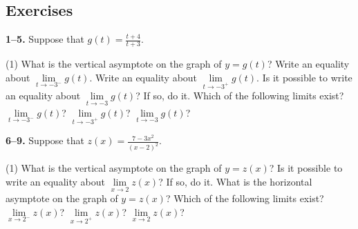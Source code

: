 \documentclass[10pt,oneside,]{book}
\theoremstyle{plain}
\theoremstyle{definition}
\numberwithin{equation}{section}
\newcommand{\fe}[2]{#1\mathopen{}\left(#2\right)\mathclose{}}
\begin{document}
\subsection[Exercises]{Exercises}\label{exercises-12}
\textbf{1--5. }\hypertarget{exercisegroup-22}{\null}Suppose that \(\fe{g}{t}=\frac{t+4}{t+3}\).%
\par
\begin{exercisegroup}(1)
\exercise[1.]\hypertarget{exercise-90}{\null}What is the vertical asymptote on the graph of \(y=\fe{g}{t}\)?%
\exercise[2.]\hypertarget{exercise-91}{\null}Write an equality about \(\lim\limits_{t\to-3^{-}}\fe{g}{t}\).%
\exercise[3.]\hypertarget{exercise-92}{\null}Write an equality about \(\lim\limits_{t\to-3^{+}}\fe{g}{t}\).%
\exercise[4.]\hypertarget{exercise-93}{\null}Is it possible to write an equality about \(\lim\limits_{t\to-3}\fe{g}{t}\)? If so, do it.%
\exercise[5.]\hypertarget{exercise-94}{\null}Which of the following limits exist?\newline{} \(\lim\limits_{t\to-3^{-}}\fe{g}{t}\)? \(\lim\limits_{t\to-3^{+}}\fe{g}{t}\)? \(\lim\limits_{t\to-3}\fe{g}{t}\)?%
\end{exercisegroup}
\par\smallskip\noindent
\textbf{6--9. }\hypertarget{exercisegroup-23}{\null}Suppose that \(\fe{z}{x}=\frac{7-3x^2}{\left(x-2\right)^2}\).%
\par
\begin{exercisegroup}(1)
\exercise[6.]\hypertarget{exercise-95}{\null}What is the vertical asymptote on the graph of \(y=\fe{z}{x}\)?%
\exercise[7.]\hypertarget{exercise-96}{\null}Is it possible to write an equality about \(\lim\limits_{x\to2}\fe{z}{x}\)? If so, do it.%
\exercise[8.]\hypertarget{exercise-97}{\null}What is the horizontal asymptote on the graph of \(y=\fe{z}{x}\)?%
\exercise[9.]\hypertarget{exercise-98}{\null}Which of the following limits exist?\newline{} \(\lim\limits_{x\to2^{-}}\fe{z}{x}\)? \(\lim\limits_{x\to2^{+}}\fe{z}{x}\)? \(\lim\limits_{x\to2}\fe{z}{x}\)?%
\end{exercisegroup}
\par\smallskip\noindent
\end{document}
